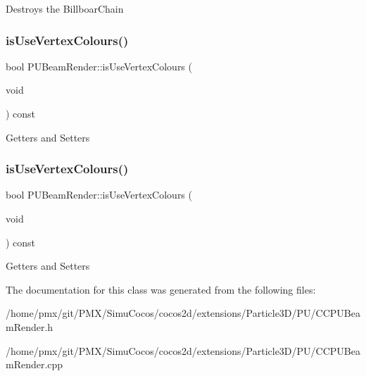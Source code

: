 Destroys the Billboar\+Chain \mbox{\label{classPUBeamRender_a2d144c9e1b72dca28de6b1a47a724820}} 
\subsubsection{\texorpdfstring{is\+Use\+Vertex\+Colours()}{isUseVertexColours()}\hspace{0.1cm}{\footnotesize\ttfamily [1/2]}}
{\footnotesize\ttfamily bool P\+U\+Beam\+Render\+::is\+Use\+Vertex\+Colours (\begin{DoxyParamCaption}\item[{void}]{ }\end{DoxyParamCaption}) const}

Getters and Setters \mbox{\label{classPUBeamRender_a2d144c9e1b72dca28de6b1a47a724820}} 
\subsubsection{\texorpdfstring{is\+Use\+Vertex\+Colours()}{isUseVertexColours()}\hspace{0.1cm}{\footnotesize\ttfamily [2/2]}}
{\footnotesize\ttfamily bool P\+U\+Beam\+Render\+::is\+Use\+Vertex\+Colours (\begin{DoxyParamCaption}\item[{void}]{ }\end{DoxyParamCaption}) const}

Getters and Setters 

The documentation for this class was generated from the following files\+:\begin{DoxyCompactItemize}
\item 
/home/pmx/git/\+P\+M\+X/\+Simu\+Cocos/cocos2d/extensions/\+Particle3\+D/\+P\+U/C\+C\+P\+U\+Beam\+Render.\+h\item 
/home/pmx/git/\+P\+M\+X/\+Simu\+Cocos/cocos2d/extensions/\+Particle3\+D/\+P\+U/C\+C\+P\+U\+Beam\+Render.\+cpp\end{DoxyCompactItemize}
